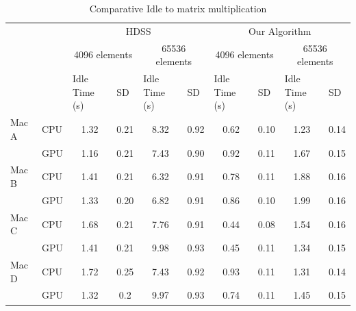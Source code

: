 \documentclass[journal]{IEEEtran}
\begin{document}
\begin{table}[htb]
\centering
\caption{Comparative Idle to matrix multiplication}
\begin{scriptsize}
\begin{tabular}{|l|l|l|l|l|l|l|l|l|l|}
\cline{3-10}
\multicolumn{1}{l}{} &  & \multicolumn{4}{c|}{HDSS} & \multicolumn{4}{c|}{Our Algorithm} \\ 
\cline{3-10}
\multicolumn{1}{l}{} &  & \multicolumn{2}{c|}{4096 elements} & \multicolumn{2}{c|}{65536 elements} & \multicolumn{2}{c|}{4096 elements} & \multicolumn{2}{c|}{65536 elements} \\ 
\cline{3-10}
\multicolumn{1}{l}{} &  & Idle Time (s) & SD & Idle Time (s) & SD & Idle Time (s) & SD & Idle Time (s) & SD \\ 
\hline
Mac A & CPU & \multicolumn{1}{c|}{1.32} & \multicolumn{1}{c|}{0.21} & \multicolumn{1}{c|}{8.32} & \multicolumn{1}{c|}{0.92} & \multicolumn{1}{c|}{0.62} & \multicolumn{1}{c|}{0.10} & \multicolumn{1}{c|}{1.23} & \multicolumn{1}{c|}{0.14} \\ 
\cline{2-10}
 & GPU & \multicolumn{1}{c|}{1.16} & \multicolumn{1}{c|}{0.21} & \multicolumn{1}{c|}{7.43} & \multicolumn{1}{c|}{0.90} & \multicolumn{1}{c|}{0.92} & \multicolumn{1}{c|}{0.11} & \multicolumn{1}{c|}{1.67} & \multicolumn{1}{c|}{0.15} \\ 
\hline
Mac B & CPU & \multicolumn{1}{c|}{1.41} & \multicolumn{1}{c|}{0.21} & \multicolumn{1}{c|}{6.32} & \multicolumn{1}{c|}{0.91} & \multicolumn{1}{c|}{0.78} & \multicolumn{1}{c|}{0.11} & \multicolumn{1}{c|}{1.88} & \multicolumn{1}{c|}{0.16} \\ 
\cline{2-10}
 & GPU & \multicolumn{1}{c|}{1.33} & \multicolumn{1}{c|}{0.20} & \multicolumn{1}{c|}{6.82} & \multicolumn{1}{c|}{0.91} & \multicolumn{1}{c|}{0.86} & \multicolumn{1}{c|}{0.10} & \multicolumn{1}{c|}{1.99} & \multicolumn{1}{c|}{0.16} \\ 
\hline
Mac C & CPU & \multicolumn{1}{c|}{1.68} & \multicolumn{1}{c|}{0.21} & \multicolumn{1}{c|}{7.76} & \multicolumn{1}{c|}{0.91} & \multicolumn{1}{c|}{0.44} & \multicolumn{1}{c|}{0.08} & \multicolumn{1}{c|}{1.54} & \multicolumn{1}{c|}{0.16} \\ 
\cline{2-10}
 & GPU & \multicolumn{1}{c|}{1.41} & \multicolumn{1}{c|}{0.21} & \multicolumn{1}{c|}{9.98} & \multicolumn{1}{c|}{0.93} & \multicolumn{1}{c|}{0.45} & \multicolumn{1}{c|}{0.11} & \multicolumn{1}{c|}{1.34} & \multicolumn{1}{c|}{0.15} \\ 
\hline
Mac D & CPU & \multicolumn{1}{c|}{1.72} & \multicolumn{1}{c|}{0.25} & \multicolumn{1}{c|}{7.43} & \multicolumn{1}{c|}{0.92} & \multicolumn{1}{c|}{0.93} & \multicolumn{1}{c|}{0.11} & \multicolumn{1}{c|}{1.31} & \multicolumn{1}{c|}{0.14} \\ 
\cline{2-10}
 & GPU & \multicolumn{1}{c|}{1.32} & \multicolumn{1}{c|}{0.2} & \multicolumn{1}{c|}{9.97} & \multicolumn{1}{c|}{0.93} & \multicolumn{1}{c|}{0.74} & \multicolumn{1}{c|}{0.11} & \multicolumn{1}{c|}{1.45} & \multicolumn{1}{c|}{0.15} \\ 
\hline
\end{tabular}
\end{scriptsize}
\label{table: ociosoBlocos}
\end{table}
\end{document}

